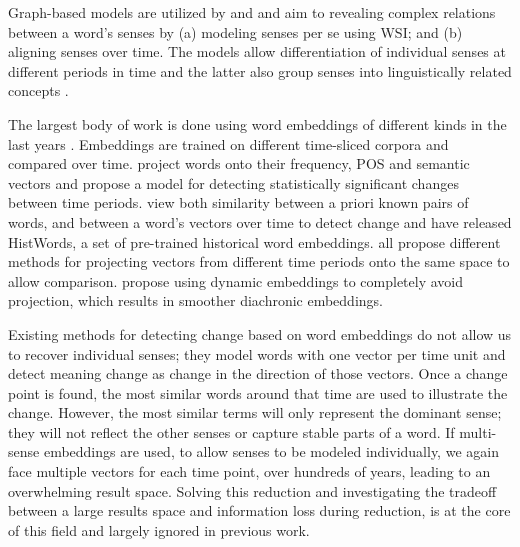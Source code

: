 \documentclass[12pt,twoside,a4paper]{article}
\newcommand\eg{{e.g.\ }}
\begin{document}
	Graph-based models are utilized by \cite{mitra2015automatic,WSE-Mitra} and \cite{Tahmasebi-RANLP2017} and aim to revealing complex relations between a word's senses by (a) modeling senses per se using WSI; and (b) aligning senses over time. The models allow differentiation of individual senses at different periods in time and the latter also group senses into linguistically related concepts \citep{Cooper05}.
	
	The largest body of work is done using word embeddings of different kinds in the last years \citep{basilediachronic,  kim-EtAl:2014:W14-25, zhang2016detecting}. Embeddings are trained on different time-sliced corpora and compared over time. \cite{kulkarni2015statistically} project words onto their frequency, POS and semantic vectors and propose a model for detecting statistically significant changes between time periods. \cite{DiachronicWordEmb} view both similarity between a priori known pairs of words, and between a word's vectors over time to detect change and have released HistWords, a set of pre-trained historical word embeddings. \cite{basilediachronic,DiachronicWordEmb,  kulkarni2015statistically} all propose different methods for projecting vectors from different time periods onto the same space to allow comparison. \cite{bamler17} propose using dynamic embeddings to completely avoid projection, which results in smoother diachronic embeddings.  
	
	
	Existing methods for detecting change based on word embeddings do not allow us to recover individual senses; they model words with one vector per time unit and detect meaning change as change in the direction of those vectors. 
	Once a change point is found, the most similar words around that time are used to illustrate the change. 
	 However, the most similar terms will only represent the dominant sense; they will not reflect the other senses or capture stable parts of a word. If multi-sense embeddings are used, to allow senses to be modeled individually, we again face multiple vectors for each time point, over hundreds of years, leading to an overwhelming result space. Solving this reduction and investigating the tradeoff between a large results space and information loss during reduction, is at the core of this field and largely ignored in previous work. 
	 	
\end{document}
